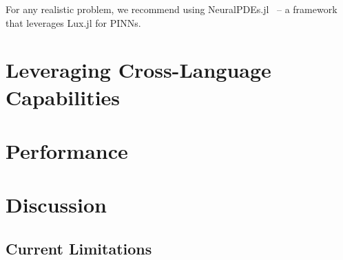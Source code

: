 \inputminted[linenos, fontsize=\footnotesize]{julia}{../code/pinn.jl}

For any realistic problem, we recommend using NeuralPDEs.jl~\citep{zubov2021neuralpde} -- a framework that leverages Lux.jl for PINNs.


\section{Leveraging Cross-Language Capabilities}
\label{sec:cross_language_capabilities}

\section{Performance}
\label{sec:performance_lux}

\section{Discussion}
\label{sec:discussion_lux}

\subsection{Current Limitations}
\label{subsec:current_limitations}
